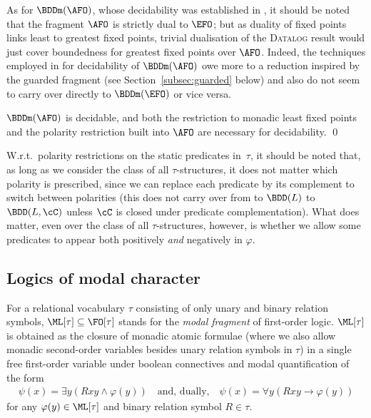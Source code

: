 \documentclass{LMCS}
\begin{document}
\noindent As for $\BDDm(\AFO)$, whose decidability was established in \cite{Otto06},
it should be noted that the fragment $\AFO$ is strictly dual to
$\EFO$\?; but as duality of fixed points links least to greatest
fixed points, trivial dualisation of the \textsc{Datalog} result would
just cover boundedness for greatest fixed points over $\AFO$.
Indeed, the techniques employed in \cite{Otto06} for decidability
of $\BDDm(\AFO)$ owe more to a reduction inspired by the guarded
fragment (see Section~\ref{subsec:guarded} below) and also do not seem to carry over directly to
$\BDDm(\EFO)$ or vice versa.

\begin{thm}
$\BDDm(\AFO)$ is decidable, and both the restriction to monadic
least fixed points and the polarity restriction built into $\AFO$ are
necessary for decidability.
\qed\end{thm}

W.r.t.\ polarity restrictions on the static predicates in~$\tau$,
it should be noted that, as long as we consider the class of all
$\tau$-structures, it does not matter which polarity is prescribed,
since we can replace each predicate by its complement to switch
between polarities (this does not carry over from to $\BDD(L)$ to
$\BDD(L,\cC)$ unless $\cC$ is closed under predicate complementation).
What does matter, even over the class of all
$\tau$-structures, however, is whether we allow some predicates to
appear both positively \emph{and} negatively in $\varphi$.


\subsection{Logics of modal character}
\label{subsec:modal}

For a relational vocabulary $\tau$ consisting of only unary and
binary relation symbols, $\ML[\tau] \subseteq \FO[\tau]$ stands for the
\emph{modal fragment} of first-order logic. $\ML[\tau]$ is obtained
as the closure of monadic atomic formulae (where we also allow
monadic second-order variables besides unary relation symbols
in $\tau$) in a single free first-order variable under boolean
connectives and modal quantification of the form
\begin{align*}
  \psi(x) = \exists y ( Rxy \wedge \varphi(y))
  \quad\text{and, dually,}\quad
  \psi(x) = \forall y ( Rxy \to \varphi(y))
\end{align*}
for any $\varphi(y) \in \ML[\tau]$ and binary relation symbol $R \in \tau$.
\end{document}
